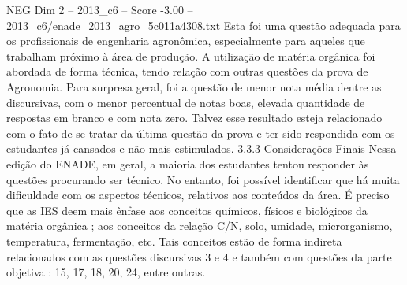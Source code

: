 \begin{textsample}{NEG Dim 2 – 2013\_c6 – Score -3.00 – 2013\_c6/enade\_2013\_agro\_5c011a4308.txt}
Esta foi uma questão adequada para os profissionais de engenharia agronômica, especialmente para aqueles que trabalham próximo à área de produção.
A utilização de matéria orgânica foi abordada de forma técnica, tendo relação com outras questões da prova de Agronomia.
Para surpresa geral, foi a questão de menor nota média dentre as discursivas, com o menor percentual de notas boas, elevada quantidade de respostas em branco e com nota zero.
Talvez esse resultado esteja relacionado com o fato de se tratar da última questão da prova e ter sido respondida com os estudantes já cansados e não mais estimulados. 3.3.3 Considerações Finais Nessa edição do ENADE, em geral, a maioria dos estudantes tentou responder às questões procurando ser técnico.
No entanto, foi possível identificar que há muita dificuldade com os aspectos técnicos, relativos aos conteúdos da área.
É preciso que as IES deem mais ênfase aos conceitos químicos, físicos e biológicos da matéria orgânica ; aos conceitos da relação C/N, solo, umidade, microrganismo, temperatura, fermentação, etc.
Tais conceitos estão de forma indireta relacionados com as questões discursivas 3 e 4 e também com questões da parte objetiva : 15, 17, 18, 20, 24, entre outras.

\end{textsample}
